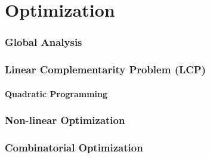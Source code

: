 \part{Optimization}\label{part:optimization}

\section{Global Analysis}\label{sec:global_analysis}

\section{Linear Complementarity Problem (LCP)}
\label{sec:linear_complementary}

\subsection{Quadratic Programming}\label{sec:quadratic_programming}



\section{Non-linear Optimization}\label{sec:nonlinear_optimization}

\section{Combinatorial Optimization}
\label{sec:combinatorial_optimization}
